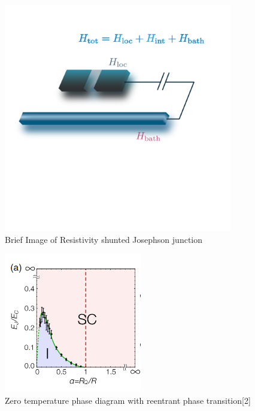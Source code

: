 \documentclass{article}[12pt]
\numberwithin{equation}{section}
\begin{document}
\begin{spacing}{1.5}
\begin{figure}[htbp]
  \centerline{\includegraphics[width=10cm]{TexFigure/Junction_RE.png}}
  \caption{Brief Image of Resistivity shunted Josephson junction}
  \label{fig:RSJJ}
\end{figure}

\begin{figure}[htbp]
  \centerline{\includegraphics[width=6cm]{TexFigure/kps_INT_exp.PNG}}
  \caption{Zero temperature phase diagram with reentrant phase transition[2]}
  \label{fig:reentrant}
\end{figure}
\end{spacing}
\pagebreak
\end{document}
